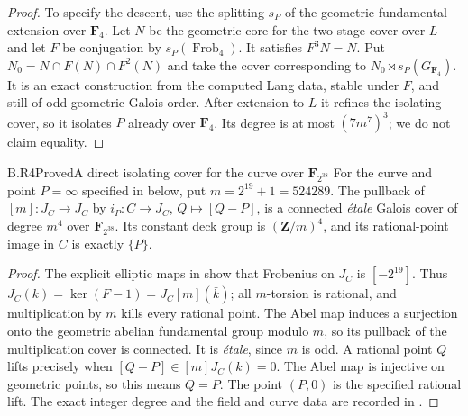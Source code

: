 \begin{proof}
To specify the descent, use the splitting $s_P$ of the geometric
fundamental extension over $\mathbf F_4$. Let $N$ be the geometric
core for the two-stage cover over $L$ and let $F$ be conjugation
by $s_P(\operatorname{Frob}_4)$. It satisfies $F^3N=N$. Put
$N_0=N\cap F(N)\cap F^2(N)$ and take the cover corresponding to
$N_0\rtimes s_P(G_{\mathbf F_4})$. It is an exact construction
from the computed Lang data, stable under $F$, and still of odd
geometric Galois order. After extension to $L$ it refines the
isolating cover, so it isolates $P$ already over $\mathbf F_4$.
Its degree is at most $(7m^7)^3$; we do not claim equality.
\end{proof}

\begin{claim}{B.R4}{Proved}{A direct isolating cover for the curve over $\mathbf F_{2^{38}}$}
For the curve and point $P=\infty$ specified in
 below, put $m=2^{19}+1=524289$.
The pullback of $[m]:J_C\to J_C$ by
$i_P:C\to J_C$, $Q\mapsto[Q-P]$, is a connected
\emph{\'etale} Galois cover of degree $m^4$ over
$\mathbf F_{2^{38}}$. Its constant deck group is
$(\mathbf Z/m)^4$, and its rational-point image in $C$ is
exactly $\{P\}$.
\end{claim}
\begin{proof}
The explicit elliptic maps in  show that
Frobenius on $J_C$ is $[-2^{19}]$. Thus
$J_C(k)=\ker(F-1)=J_C[m](\bar k)$; all $m$-torsion is rational,
and multiplication by $m$ kills every rational point.
The Abel map induces a surjection onto the geometric abelian
fundamental group modulo $m$, so its pullback of the multiplication
cover is connected. It is \emph{\'etale}, since $m$ is odd.
A rational point $Q$ lifts precisely when $[Q-P]\in[m]J_C(k)=0$.
The Abel map is injective on geometric points, so this means $Q=P$.
The point $(P,0)$ is the specified rational lift. The exact integer
degree and the field and curve data are recorded in
.
\end{proof}

